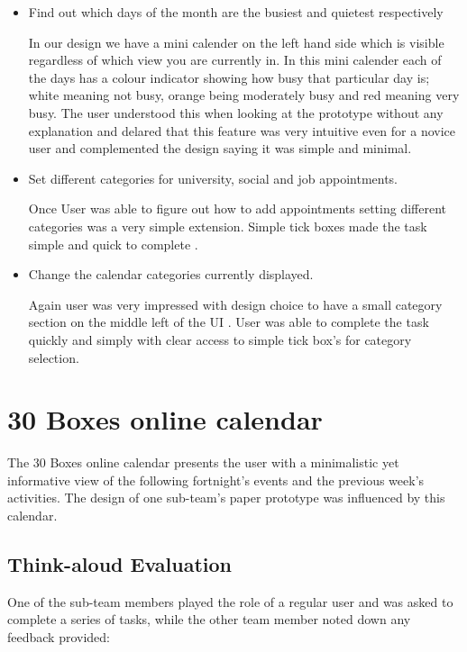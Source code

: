 \documentclass{article}
\begin{document}
\begin{itemize}
\item Find out which days of the month are the busiest and quietest
respectively

In our design we have a mini calender on the left hand side which is 
visible regardless of which view you are currently in. In this mini calender
each of the days has a colour indicator showing how busy that particular day 
is; white meaning not busy, orange being moderately busy and red meaning very
busy. The user understood this when looking at the prototype without any 
explanation and delared that this feature was very intuitive even for a novice 
user and complemented the design saying it was simple and minimal.

\item Set different categories for university, social and job appointments.

Once User was able to figure out how to add appointments setting different categories 
was a very simple extension. Simple tick boxes made the task simple and quick to 
complete .

\item Change the calendar categories currently displayed.

Again user was very impressed with design choice to have a small category section on 
the middle left of the UI . User was able to complete the task quickly and simply with 
clear access to simple tick box's for category selection. 

\end{itemize}


\section{30 Boxes online calendar}

The 30 Boxes online calendar presents the user with a minimalistic yet 
informative view of the following fortnight's events and the previous 
week's activities. The design of one sub-team's paper prototype was influenced 
by this calendar. 

\subsection{Think-aloud Evaluation}

One of the sub-team members played the role of a regular user and was asked to 
complete a series of tasks, while the other team member noted down any
feedback provided:
\end{document}
